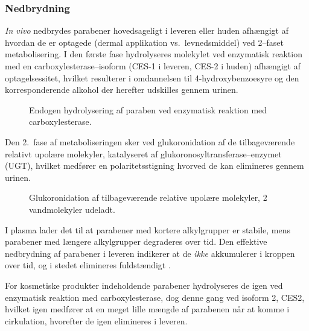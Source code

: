     \subsubsection{Nedbrydning}
    \textit{In vivo} nedbrydes parabener hovedsageligt i leveren eller huden afhængigt af hvordan de er optagede (dermal applikation vs.\ levnedsmiddel) ved 2--faset metabolisering. I den første fase hydrolyseres molekylet ved enzymatisk reaktion med en carboxylesterase--isoform (CES-1 i leveren, CES-2 i huden) afhængigt af optagelsessitet, hvilket resulterer i omdannelsen til 4-hydroxybenzoesyre og den korresponderende alkohol der herefter udskilles gennem urinen.
    \begin{figure}[H]
        \caption{Endogen hydrolysering af paraben ved enzymatisk reaktion med carboxylesterase.}
    \end{figure}
    Den 2.\ fase af metaboliseringen sker ved glukoronidation af de tilbageværende relativt upolære molekyler, katalyseret af glukoronosyltransferase--enzymet (UGT), hvilket medfører en polaritetsstigning hvorved de kan elimineres gennem urinen.
    \begin{figure}[H]
        \caption{Glukoronidation af tilbageværende relative upolære molekyler, 2 vandmolekyler udeladt.}
    \end{figure}
    I plasma lader det til at parabener med kortere alkylgrupper er stabile, mens parabener med længere alkylgrupper degraderes over tid. Den effektive nedbrydning af parabener i leveren indikerer at de \textit{ikke} akkumulerer i kroppen over tid, og i stedet elimineres fuldstændigt \parencite{Suza2010}.

    For kosmetiske produkter indeholdende parabener hydrolyseres de igen ved enzymatisk reaktion med carboxylesterase, dog denne gang ved isoform 2, CES2, hvilket igen medfører at en meget lille mængde af parabenen når at komme i cirkulation, hvorefter de igen elimineres i leveren.

